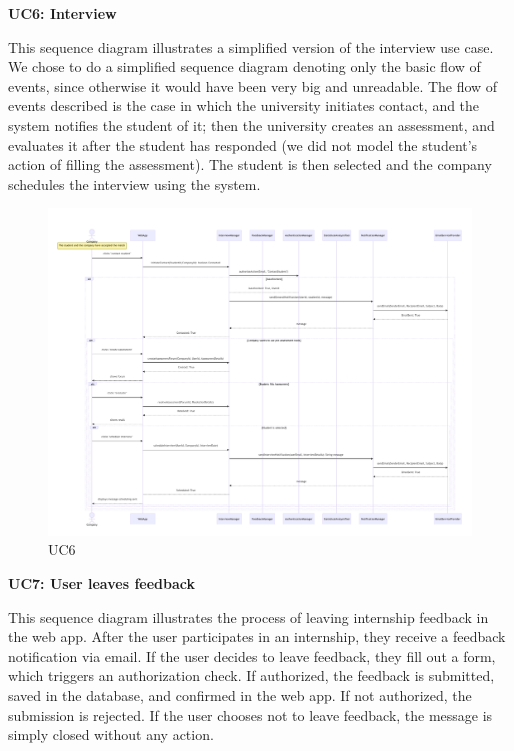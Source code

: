 \newpage
\textbf{UC6: Interview}

This sequence diagram illustrates a simplified version of the interview use case. We chose to do a simplified sequence diagram denoting only the basic flow of events, since otherwise it would have been very big and unreadable. The flow of events described is the case in which the university initiates contact, and the system notifies the student of it; then the university creates an assessment, and evaluates it after the student has responded (we did not model the student's action of filling the assessment). The student is then selected and the company schedules the interview using the system.

\begin{figure}[H]
    \centering
    \hspace{-1 cm} %
    \includegraphics[width=1.1\linewidth]{DD//Images/SequenceDiagrams/UC6.pdf}
    \caption{UC6}
\end{figure}

\newpage
\textbf{UC7: User leaves feedback}

This sequence diagram illustrates the process of leaving internship feedback in the web app. After the user participates in an internship, they receive a feedback notification via email. If the user decides to leave feedback, they fill out a form, which triggers an authorization check. If authorized, the feedback is submitted, saved in the database, and confirmed in the web app. If not authorized, the submission is rejected. If the user chooses not to leave feedback, the message is simply closed without any action.

